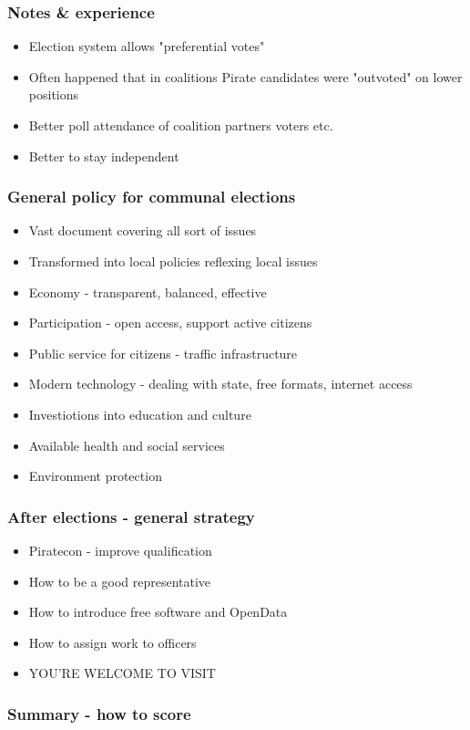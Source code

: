 \begin{frame}
	\frametitle{Notes \& experience}
	\begin{itemize}
		\item Election system allows "preferential votes"
		\item Often happened that in coalitions Pirate candidates were "outvoted" on lower positions
		\item Better poll attendance of coalition partners voters etc.
		\item Better to stay independent
	\end{itemize}
\end{frame}
\begin{frame}
	\frametitle{General policy for communal elections}
	\begin{itemize}
		\item Vast document covering all sort of issues
		\item Transformed into local policies reflexing local issues
		\item Economy - transparent, balanced, effective
		\item Participation - open access, support active citizens
		\item Public service for citizens - traffic infrastructure
		\item Modern technology - dealing with state, free formats, internet access
		\item Investiotions into education and culture
		\item Available health and social services
		\item Environment protection
	\end{itemize}
\end{frame}
\begin{frame}
	\frametitle{After elections - general strategy}
	\begin{itemize}
		\item Piratecon - improve qualification
		\item How to be a good representative
		\item How to introduce free software and OpenData
		\item How to assign work to officers
		\item YOU'RE WELCOME TO VISIT
	\end{itemize}
\end{frame}
\begin{frame}
	\frametitle{Summary - how to score}
\end{frame}
